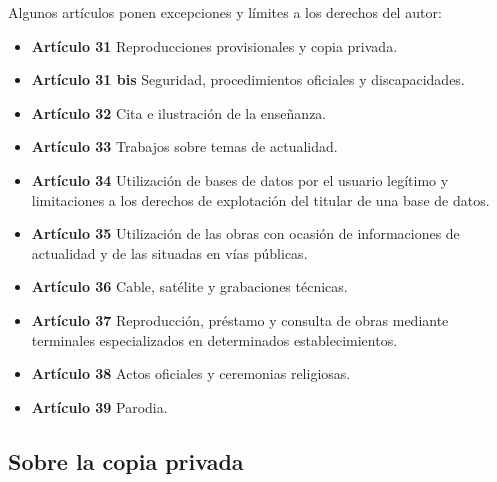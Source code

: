 Algunos artículos ponen excepciones y límites a los derechos del autor:
\begin{itemize}
    \item\textbf{Artículo 31} Reproducciones provisionales y copia privada.
    \item\textbf{Artículo 31 bis} Seguridad, procedimientos oficiales y discapacidades.
    \item\textbf{Artículo 32} Cita e ilustración de la enseñanza.
    \item\textbf{Artículo 33} Trabajos sobre temas de actualidad.
    \item\textbf{Artículo 34} Utilización de bases de datos por el usuario legítimo y limitaciones a los derechos de explotación del titular de una base de datos.
    \item\textbf{Artículo 35} Utilización de las obras con ocasión de informaciones de actualidad y de las situadas en vías públicas.
    \item\textbf{Artículo 36} Cable, satélite y grabaciones técnicas.
    \item\textbf{Artículo 37} Reproducción, préstamo y consulta de obras mediante terminales especializados en determinados establecimientos.
    \item\textbf{Artículo 38} Actos oficiales y ceremonias religiosas.
    \item\textbf{Artículo 39} Parodia.
\end{itemize}

\subsection{Sobre la copia privada} %

